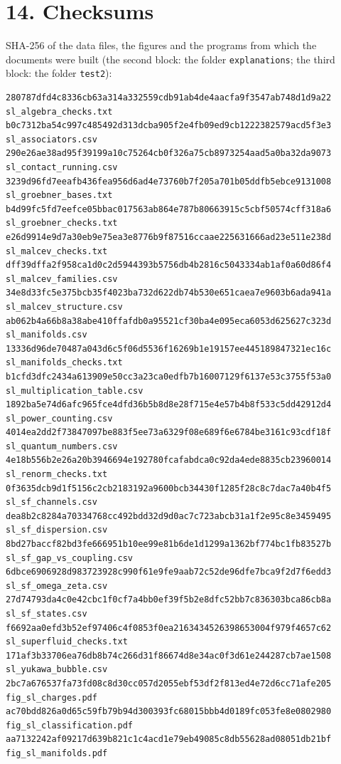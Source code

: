 \documentclass[
  10pt,
]{article}
\begin{document}
\hypertarget{checksums}{%
\section{14. Checksums}\label{checksums}}

SHA-256 of the data files, the figures and the programs from which the
documents were built (the second block: the folder
\texttt{explanations}; the third block: the folder \texttt{test2}):

\begin{verbatim}
280787dfd4c8336cb63a314a332559cdb91ab4de4aacfa9f3547ab748d1d9a22  sl_algebra_checks.txt
b0c7312ba54c997c485492d313dcba905f2e4fb09ed9cb1222382579acd5f3e3  sl_associators.csv
290e26ae38ad95f39199a10c75264cb0f326a75cb8973254aad5a0ba32da9073  sl_contact_running.csv
3239d96fd7eeafb436fea956d6ad4e73760b7f205a701b05ddfb5ebce9131008  sl_groebner_bases.txt
b4d99fc5fd7eefce05bbac017563ab864e787b80663915c5cbf50574cff318a6  sl_groebner_checks.txt
e26d9914e9d7a30eb9e75ea3e8776b9f87516ccaae225631666ad23e511e238d  sl_malcev_checks.txt
dff39dffa2f958ca1d0c2d5944393b5756db4b2816c5043334ab1af0a60d86f4  sl_malcev_families.csv
34e8d33fc5e375bcb35f4023ba732d622db74b530e651caea7e9603b6ada941a  sl_malcev_structure.csv
ab062b4a66b8a38abe410ffafdb0a95521cf30ba4e095eca6053d625627c323d  sl_manifolds.csv
13336d96de70487a043d6c5f06d5536f16269b1e19157ee445189847321ec16c  sl_manifolds_checks.txt
b1cfd3dfc2434a613909e50cc3a23ca0edfb7b16007129f6137e53c3755f53a0  sl_multiplication_table.csv
1892ba5e74d6afc965fce4dfd36b5b8d8e28f715e4e57b4b8f533c5dd42912d4  sl_power_counting.csv
4014ea2dd2f73847097be883f5ee73a6329f08e689f6e6784be3161c93cdf18f  sl_quantum_numbers.csv
4e18b556b2e26a20b3946694e192780fcafabdca0c92da4ede8835cb23960014  sl_renorm_checks.txt
0f3635dcb9d1f5156c2cb2183192a9600bcb34430f1285f28c8c7dac7a40b4f5  sl_sf_channels.csv
dea8b2c8284a70334768cc492bdd32d9d0ac7c723abcb31a1f2e95c8e3459495  sl_sf_dispersion.csv
8bd27baccf82bd3fe666951b10ee99e81b6de1d1299a1362bf774bc1fb83527b  sl_sf_gap_vs_coupling.csv
6dbce6906928d983723928c990f61e9fe9aab72c52de96dfe7bca9f2d7f6edd3  sl_sf_omega_zeta.csv
27d74793da4c0e42cbc1f0cf7a4bb0ef39f5b2e8dfc52bb7c836303bca86cb8a  sl_sf_states.csv
f6692aa0efd3b52ef97406c4f0853f0ea2163434526398653004f979f4657c62  sl_superfluid_checks.txt
171af3b33706ea76db8b74c266d31f86674d8e34ac0f3d61e244287cb7ae1508  sl_yukawa_bubble.csv
2bc7a676537fa73fd08c8d30cc057d2055ebf53df2f813ed4e72d6cc71afe205  fig_sl_charges.pdf
ac70bdd826a0d65c59fb79b94d300393fc68015bbb4d0189fc053fe8e0802980  fig_sl_classification.pdf
aa7132242af09217d639b821c1c4acd1e79eb49085c8db55628ad08051db21bf  fig_sl_manifolds.pdf

\end{verbatim}
\end{document}
